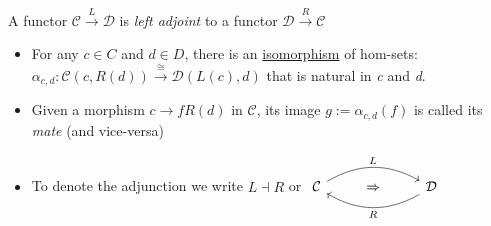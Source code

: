 A functor $\mathcal{C}\xrightarrow{L}\mathcal{D}$ is \emph{left adjoint} to a functor  $\mathcal{D}\xrightarrow{R}\mathcal{C}$

\begin{itemize}
    \item  For any $c \in C$ and $d \in D$, there is an \hyperref[D3.28]{isomorphism} of hom-sets: $\alpha_{c,d}: \mathcal{C}(c,R(d)) \xrightarrow{\cong} \mathcal{D}(L(c),d)$ that is natural in \emph{c} and \emph{d}.
    \item Given a morphism $c \rightarrow{f} R(d)$ in $\mathcal{C}$, its image $g:=\alpha_{c,d}(f)$ is called its \emph{mate} (and vice-versa)
    \item To denote the adjunction we write $L \dashv R$ or $\begin{tikzcd}\mathcal{C} \arrow[rr, "L", bend left] & \Rightarrow & \mathcal{D} \arrow[ll, "R", bend left]\end{tikzcd}$

  \end{itemize}

